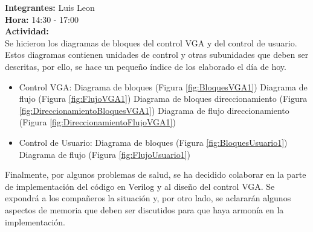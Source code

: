 \documentclass[12pt,a4paper]{report}
\begin{document}
\noindent \textbf{Integrantes:} Luis Leon \\[1ex]
\textbf{Hora:} 14:30 - 17:00 \\[1ex]
\textbf{Actividad:} \\[2ex]

Se hicieron los diagramas de bloques del control VGA y del control de usuario. Estos diagramas contienen unidades de control y otras subunidades que deben ser descritas, por ello, se hace un pequeño índice de los elaborado el día de hoy. \\

\begin{itemize}
	\item Control VGA: 
	\subitem Diagrama de bloques (Figura \ref{fig:BloquesVGA1}) 
	\subitem Diagrama de flujo (Figura \ref{fig:FlujoVGA1})
	\subitem Diagrama de bloques direccionamiento (Figura \ref{fig:DireccionamientoBloquesVGA1})
	\subitem Diagrama de flujo direccionamiento (Figura \ref{fig:DireccionamientoFlujoVGA1})
	\item Control de Usuario:
	\subitem Diagrama de bloques (Figura \ref{fig:BloquesUsuario1})
	\subitem Diagrama de flujo (Figura \ref{fig:FlujoUsuario1})
\end{itemize}

Finalmente, por algunos problemas de salud, se ha decidido colaborar en la parte de implementación del código en Verilog y al diseño del control VGA. Se expondrá a los compañeros la situación y, por otro lado, se aclararán algunos aspectos de memoria que deben ser discutidos para que haya armonía en la implementación.
\end{document}
